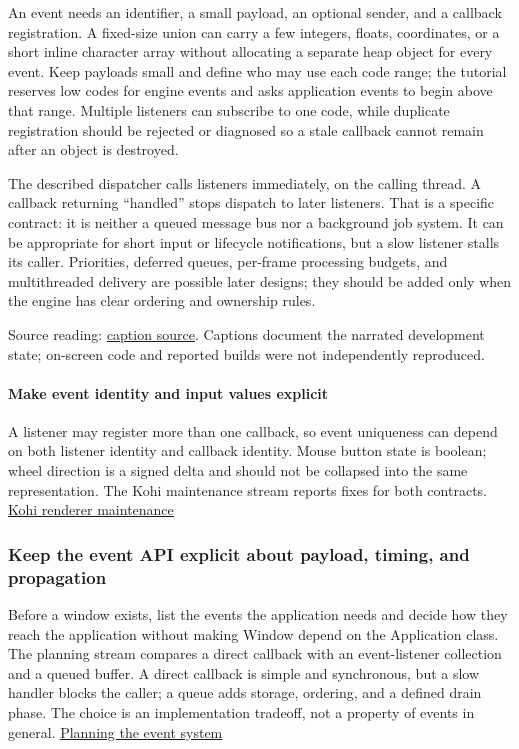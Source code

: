 An event needs an identifier, a small payload, an optional sender, and a callback registration. A fixed-size union can carry a few integers, floats, coordinates, or a short inline character array without allocating a separate heap object for every event. Keep payloads small and define who may use each code range; the tutorial reserves low codes for engine events and asks application events to begin above that range. Multiple listeners can subscribe to one code, while duplicate registration should be rejected or diagnosed so a stale callback cannot remain after an object is destroyed.

The described dispatcher calls listeners immediately, on the calling thread. A callback returning ``handled'' stops dispatch to later listeners. That is a specific contract: it is neither a queued message bus nor a background job system. It can be appropriate for short input or lifecycle notifications, but a slow listener stalls its caller. Priorities, deferred queues, per-frame processing budgets, and multithreaded delivery are possible later designs; they should be added only when the engine has clear ordering and ownership rules.

Source reading: \href{https://www.youtube.com/watch?v=XQ6qljkh2KI}{caption source}. Captions document the narrated development state; on-screen code and reported builds were not independently reproduced.

\paragraph{Make event identity and input values explicit}\label{make-event-identity-and-input-values-explicit}

A listener may register more than one callback, so event uniqueness can depend on both listener identity and callback identity. Mouse button state is boolean; wheel direction is a signed delta and should not be collapsed into the same representation. The Kohi maintenance stream reports fixes for both contracts. \href{https://www.youtube.com/watch?v=x8ao57nbMlY}{Kohi renderer maintenance}

\subsubsection{Keep the event API explicit about payload, timing, and propagation}\label{keep-the-event-api-explicit-about-payload-timing-and-propagation}

Before a window exists, list the events the application needs and decide how they reach the application without making Window depend on the Application class. The planning stream compares a direct callback with an event-listener collection and a queued buffer. A direct callback is simple and synchronous, but a slow handler blocks the caller; a queue adds storage, ordering, and a defined drain phase. The choice is an implementation tradeoff, not a property of events in general. \href{https://www.youtube.com/watch?v=5mlziHwq90k}{Planning the event system}

